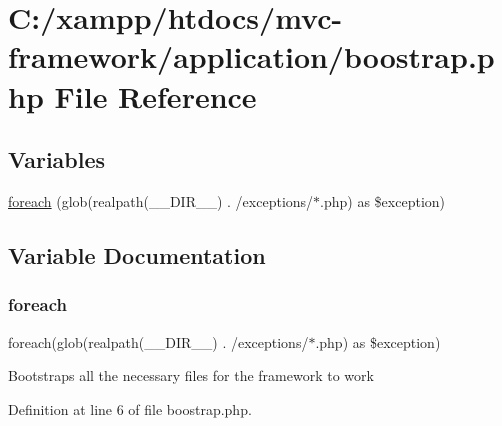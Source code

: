 \hypertarget{boostrap_8php}{}\section{C\+:/xampp/htdocs/mvc-\/framework/application/boostrap.php File Reference}
\label{boostrap_8php}
\subsection*{Variables}
\begin{DoxyCompactItemize}
\item 
\hyperlink{boostrap_8php_a1e0ec546eaadad6fd93cece86777fc3d}{foreach} (glob(realpath(\+\_\+\+\_\+\+D\+I\+R\+\_\+\+\_\+) . \textquotesingle{}/exceptions/$\ast$.php\textquotesingle{}) as \$exception)
\end{DoxyCompactItemize}


\subsection{Variable Documentation}
\hypertarget{boostrap_8php_a1e0ec546eaadad6fd93cece86777fc3d}{}\label{boostrap_8php_a1e0ec546eaadad6fd93cece86777fc3d} 
\subsubsection{\texorpdfstring{foreach}{foreach}}
{\footnotesize\ttfamily foreach(glob(realpath(\+\_\+\+\_\+\+D\+I\+R\+\_\+\+\_\+) . \textquotesingle{}/exceptions/$\ast$.php\textquotesingle{}) as \$exception)}

Bootstraps all the necessary files for the framework to work 

Definition at line 6 of file boostrap.\+php.

